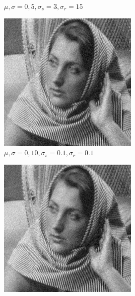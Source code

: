 \documentclass[a4paper, landscape]{article}
\begin{document}
\begin{figure}
\begin{subfigure}{0.33\linewidth}
        \caption{$\mu, \sigma = 0, 5, \sigma_s=3, \sigma_r=15$}
    \end{subfigure}
    \begin{subfigure}{0.33\linewidth}
        \centering
        \includegraphics[width=\linewidth]{barbara256,σ_noise10,σ_spatial0.1,σ_range0.1.png}
        \caption{$\mu, \sigma = 0, 10, \sigma_s=0.1, \sigma_r=0.1$}
    \end{subfigure}
    \begin{subfigure}{0.33\linewidth}
        \centering
        \includegraphics[width=\linewidth]{barbara256,σ_noise10,σ_spatial2,σ_range2.png}

\end{subfigure}
\end{figure}
\end{document}
